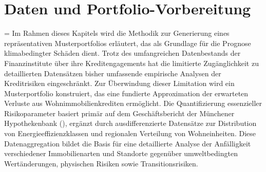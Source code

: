 \section{Daten und Portfolio-Vorbereitung}

\begin{sloppypar}
\emergencystretch=\hsize
Im Rahmen dieses Kapitels wird die Methodik zur Generierung eines repräsentativen Musterportfolios erläutert, das als Grundlage für die Prognose klimabedingter Schäden dient. Trotz des umfangreichen Datenbestands der Finanzinstitute über ihre Kredit\-engagements hat die limitierte Zugänglichkeit zu detaillierten Datensätzen bisher umfassende empirische Analysen der Kreditrisiken eingeschränkt. Zur Überwindung dieser Limitation wird ein Musterportfolio konstruiert, das eine fundierte Approximation der erwarteten Verluste aus Wohn\-immobilien\-krediten ermöglicht. Die Quantifizierung essenzieller Risikoparameter basiert primär auf dem Geschäftsbericht der Münchener Hypothekenbank (\cite{MuenchenerHyp2022}), ergänzt durch ausdifferenzierte Datensätze zur Distribution von Energie\-effizienz\-klassen und regionalen Verteilung von Wohneinheiten. Diese Datenaggregation bildet die Basis für eine detaillierte Analyse der Anfälligkeit verschiedener Immobilienarten und Standorte gegenüber umweltbedingten Wert\-änderungen, physischen Risiken sowie Transitions\-risiken.
\end{sloppypar}